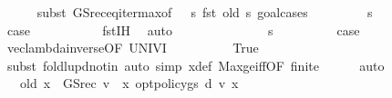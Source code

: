 \begin{isabellebody}
\ \ \ \ \isamarkupfalse%
\ {\isacharparenleft}{\kern0pt}subst\ GS{\isacharunderscore}{\kern0pt}rec{\isacharunderscore}{\kern0pt}eq{\isacharunderscore}{\kern0pt}iter{\isacharunderscore}{\kern0pt}max{\isacharbrackleft}{\kern0pt}of\ {\isacharunderscore}{\kern0pt}\ {\isachardoublequoteopen}{\isacharparenleft}{\kern0pt}{\isasymchi}\ s{\isachardot}{\kern0pt}\ fst\ {\isacharparenleft}{\kern0pt}{\isacharquery}{\kern0pt}old\ s{\isacharparenright}{\kern0pt}{\isacharparenright}{\kern0pt}{\isachardoublequoteclose}{\isacharbrackright}{\kern0pt}{\isacharcomma}{\kern0pt}\ goal{\isacharunderscore}{\kern0pt}cases{\isacharparenright}{\kern0pt}\isanewline
\ \ \ \ \ \ \isamarkupfalse%
\ {\isacharparenleft}{\kern0pt}{}\ s{\isacharparenright}{\kern0pt}\isanewline
\ \ \ \ \ \ \isamarkupfalse%
\ \isamarkupfalse%
\ {\isacharquery}{\kern0pt}case\ \isanewline
\ \ \ \ \ \ \ \ \isamarkupfalse%
\ fst{\isacharunderscore}{\kern0pt}IH\ \isamarkupfalse%
\ auto\ \isanewline
\ \ \ \ \isamarkupfalse%
\isanewline
\ \ \ \ \ \ \isamarkupfalse%
\ {\isacharparenleft}{\kern0pt}{}\ s{\isacharparenright}{\kern0pt}\isanewline
\ \ \ \ \ \ \isamarkupfalse%
\ \isamarkupfalse%
\ {\isacharquery}{\kern0pt}case\isanewline
\ \ \ \ \ \ \ \ \isamarkupfalse%
\ vec{\isacharunderscore}{\kern0pt}lambda{\isacharunderscore}{\kern0pt}inverse{\isacharbrackleft}{\kern0pt}OF\ UNIV{\isacharunderscore}{\kern0pt}I{\isacharbrackright}{\kern0pt}\isanewline
\ \ \ \ \ \ \ \ \isamarkupfalse%
\ True\isanewline
\ \ \ \ \ \ \ \ \isamarkupfalse%
\ {\isacharparenleft}{\kern0pt}subst\ foldl{\isacharunderscore}{\kern0pt}upd{\isacharunderscore}{\kern0pt}notin{\isacharparenright}{\kern0pt}\ {\isacharparenleft}{\kern0pt}auto\ simp{\isacharcolon}{\kern0pt}\ x{\isacharprime}{\kern0pt}{\isacharunderscore}{\kern0pt}def\ Max{\isacharunderscore}{\kern0pt}ge{\isacharunderscore}{\kern0pt}iff{\isacharbrackleft}{\kern0pt}OF\ finite{\isacharbrackright}{\kern0pt}{\isacharparenright}{\kern0pt}\isanewline
\ \ \ \ \isamarkupfalse%
\ auto\isanewline
\ \ \ \ \isamarkupfalse%
\ \isamarkupfalse%
\ {\isachardoublequoteopen}{\isasymdots}\ {\isacharequal}{\kern0pt}\ {\isacharparenleft}{\kern0pt}{\isacharquery}{\kern0pt}old\ {\isacharparenleft}{\kern0pt}x\ {\isacharcolon}{\kern0pt}{\isacharequal}{\kern0pt}\ {\isacharparenleft}{\kern0pt}GS{\isacharunderscore}{\kern0pt}rec\ v\ {\isachardollar}{\kern0pt}\ x{\isacharcomma}{\kern0pt}\ opt{\isacharunderscore}{\kern0pt}policy{\isacharunderscore}{\kern0pt}gs{\isacharprime}{\kern0pt}\ d\ v\ x{\isacharparenright}{\kern0pt}{\isacharparenright}{\kern0pt}{\isacharparenright}{\kern0pt}{\isachardoublequoteclose}\isanewline

\end{isabellebody}
